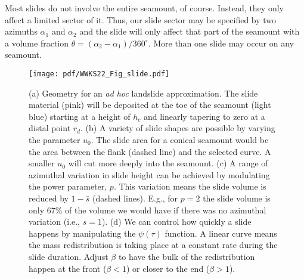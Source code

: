 Most slides do not involve the entire seamount, of course. Instead, they only affect a limited sector of it.
Thus, our slide sector may be specified by two azimuths $\alpha_1$ and $\alpha_2$ and the slide will only affect
that part of the seamount with a volume fraction $\theta = (\alpha_2 - \alpha_1)/360^{\circ}$.  More than one slide may
occur on any seamount.

\begin{figure}
\centering
\texttt{[image: pdf/WWKS22\_Fig\_slide.pdf]}
\caption{(a) Geometry for an \emph{ad hoc} landslide approximation.  The slide material (pink)
  will be deposited at the toe of the seamount (light blue) starting at a height of $h_c$ and linearly
  tapering to zero at a distal point $r_d$.
  (b) A variety of slide shapes are possible by varying the parameter $u_0$.  The slide area for a conical seamount
  would be the area between the flank (dashed line) and the selected curve. A smaller $u_0$ will cut more deeply
  into the seamount.
  (c) A range of azimuthal variation in slide height can be achieved by modulating the power parameter, $p$.
  This variation means the slide volume is reduced by $1 - \bar{s}$ (dashed lines). E.g., for $p = 2$ the slide
  volume is only 67\% of the volume we would have if there was no azimuthal variation (i.e., $s = 1$).
  (d) We can control how quickly a slide happens by manipulating the $\psi(\tau)$ function. A
  linear curve means the mass redistribution is taking place at a constant rate during the slide duration.
  Adjust $\beta$ to have the bulk of the redistribution happen at the front ($\beta < 1$) or closer
  to the end ($\beta > 1$).}
\label{WWKS22_Fig_slide}
\end{figure}

